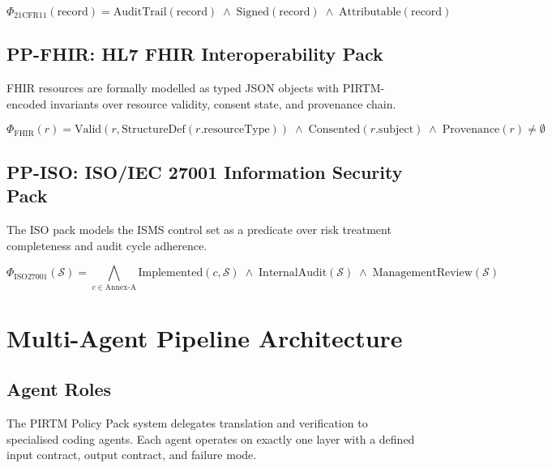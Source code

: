 \documentclass[12pt,letterpaper]{article}
\theoremstyle{definition}
\theoremstyle{plain}
\theoremstyle{remark}
\begin{document}
\begin{equation}
\Phi_{\text{21CFR11}}(\text{record}) =
  \text{AuditTrail}(\text{record}) \;\wedge\;
  \text{Signed}(\text{record}) \;\wedge\;
  \text{Attributable}(\text{record})
\label{eq:fdapred}
\end{equation}

\subsection{PP-FHIR: HL7 FHIR Interoperability Pack}

FHIR resources are formally modelled as typed JSON objects with PIRTM-encoded
invariants over resource validity, consent state, and provenance chain.

\begin{equation}
\Phi_{\text{FHIR}}(r) =
  \text{Valid}(r, \text{StructureDef}(r.\text{resourceType}))
  \;\wedge\;
  \text{Consented}(r.\text{subject}) \;\wedge\;
  \text{Provenance}(r) \neq \emptyset
\label{eq:fhirpred}
\end{equation}

\subsection{PP-ISO: ISO/IEC 27001 Information Security Pack}

The ISO pack models the ISMS control set as a predicate over risk treatment
completeness and audit cycle adherence.

\begin{equation}
\Phi_{\text{ISO27001}}(\mathcal{S}) =
  \bigwedge_{c \in \text{Annex-A}} \text{Implemented}(c, \mathcal{S})
  \;\wedge\;
  \text{InternalAudit}(\mathcal{S}) \;\wedge\;
  \text{ManagementReview}(\mathcal{S})
\label{eq:isopred}
\end{equation}

\section{Multi-Agent Pipeline Architecture}
\label{sec:agents}

\subsection{Agent Roles}

The PIRTM Policy Pack system delegates translation and verification to
specialised coding agents. Each agent operates on exactly one layer with a
defined input contract, output contract, and failure mode.
\end{document}
